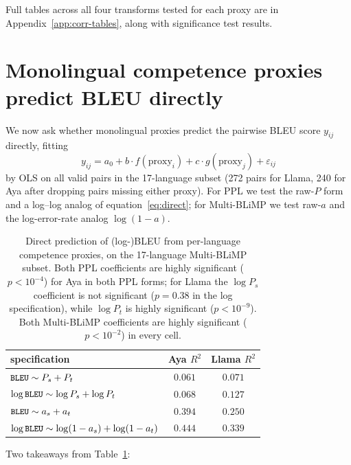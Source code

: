 \documentclass[11pt]{article}
\newcommand{\code}[1]{\texttt{\small #1}}
\begin{document}
Full tables across all four transforms tested for each proxy are in
Appendix~\ref{app:corr-tables}, along with significance test results.

\section{Monolingual competence proxies predict BLEU directly}
\label{sec:bleu-prediction}

We now ask whether monolingual proxies predict the pairwise BLEU
score $y_{ij}$ directly, fitting
\begin{equation}
y_{ij} = a_0 + b \cdot f(\mathrm{proxy}_i) + c \cdot g(\mathrm{proxy}_j)
       + \varepsilon_{ij}
\label{eq:direct}
\end{equation}
by OLS on all valid pairs in the 17-language subset (272 pairs for
Llama, 240 for Aya after dropping pairs missing either proxy). For
PPL we test the raw-$P$ form and a log--log analog of
equation~\eqref{eq:direct}; for Multi-BLiMP we test raw-$a$ and the
log-error-rate analog $\log(1-a)$.

\begin{table}[h]
\centering
\small
\begin{tabular}{lcc}
\toprule
specification & Aya $R^2$ & Llama $R^2$ \\
\midrule
$\code{BLEU} \sim P_s + P_t$                                 & $0.061$ & $0.071$ \\
$\log\code{BLEU} \sim \log P_s + \log P_t$                   & $0.068$ & $0.127$ \\
$\code{BLEU} \sim a_s + a_t$                                 & $\mathbf{0.394}$ & $\mathbf{0.250}$ \\
$\log\code{BLEU} \sim \log(1-a_s) + \log(1-a_t)$             & $\mathbf{0.444}$ & $\mathbf{0.339}$ \\
\bottomrule
\end{tabular}
\caption{Direct prediction of (log-)BLEU from per-language competence
proxies, on the 17-language Multi-BLiMP subset. Both PPL coefficients
are highly significant ($p < 10^{-4}$) for Aya in both PPL forms; for
Llama the $\log P_s$ coefficient is not significant ($p = 0.38$ in the
log specification), while $\log P_t$ is highly significant ($p <
10^{-9}$). Both Multi-BLiMP coefficients are highly significant ($p
< 10^{-2}$) in every cell.}
\label{tab:direct}
\end{table}

Two takeaways from Table~\ref{tab:direct}:
\end{document}
